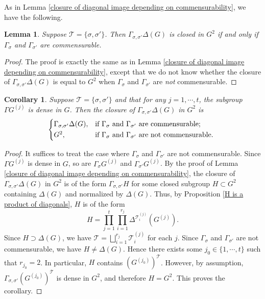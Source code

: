 \documentclass[11pt,oneside,reqno]{amsart}
\newcommand{\Tcal}{\mathcal{T}}
\theoremstyle{plain}
\newtheorem{corollary}[theorem]{Corollary}
\newtheorem{lemma}[theorem]{Lemma}
\begin{document}
	
	
	
	
	
	
	
	
	
	
	As in Lemma \ref{closure of diagonal image depending on commensurability}, we have the following.
	\begin{lemma}
		Suppose $\Tcal=\{\sigma,\sigma'\}$. Then $\Gamma_{\sigma,\sigma'}\Delta(G)$ is closed in $G^2$ if and only if $\Gamma_{\sigma}$ and $\Gamma_{\sigma'}$ are commensurable.
	\end{lemma}
	\begin{proof}
		The proof is exactly the same as in Lemma \ref{closure of diagonal image depending on commensurability}, except that we do not know whether the closure of $\Gamma_{\sigma,\sigma'}\Delta(G)$ is equal to $G^2$ when $\Gamma_{\sigma}$ and $\Gamma_{\sigma'}$ are \emph{not} commensurable.
	\end{proof}
	
	
	
	
	\begin{corollary}\label{Gamma_sigma and Gamma_sigma' comm or not, not simple}
		Suppose $\Tcal=\{\sigma,\sigma'\}$ and that for any $j=1,\cdots,t$, the subgroup $\Gamma G^{(j)}$ is dense in $G$. Then the closure of $\Gamma_{\sigma,\sigma'}\Delta(G)$ in $G^2$ is
		\[
		\begin{cases*}
			\Gamma_{\sigma,\sigma'}\Delta(G),
			&
			if $\Gamma_{\sigma}$ and $\Gamma_{\sigma'}$ are commensurable;
			\\
			G^2,
			&
			if $\Gamma_{\sigma}$ and $\Gamma_{\sigma'}$ are not commensurable.
		\end{cases*}
		\]
	\end{corollary}
	\begin{proof}
		It suffices to treat the case where $\Gamma_{\sigma}$ and $\Gamma_{\sigma'}$ are not commensurable.
		Since $\Gamma G^{(j)}$ is dense in $G$, so are $\Gamma_{\sigma}G^{(j)}$ and $\Gamma_{\sigma'}G^{(j)}$.
		By the proof of Lemma \ref{closure of diagonal image depending on commensurability}, the closure of $\Gamma_{\sigma,\sigma'}\Delta(G)$ in $G^2$ is of the form $\Gamma_{\sigma,\sigma'}H$ for some closed subgroup $H\subset G^2$ containing $\Delta(G)$ and normalized by $\Delta(G)$.
		Thus, by Proposition \ref{H is a product of diagonals}, $H$ is of the form
		\[
		H=\prod_{j=1}^t\prod_{i=1}^{r_j}\Delta^{\Tcal_i^{(j)}}(G^{(j)}).
		\]
		Since $H\supset\Delta(G)$, we have $\Tcal=\bigsqcup_{i=1}^{r_j}\Tcal_i^{(j)}$ for each $j$.
		Since $\Gamma_{\sigma}$ and $\Gamma_{\sigma'}$ are not commensurable, we have $H\neq\Delta(G)$. Hence there exists some $j_0\in\{1,\cdots,t\}$ such that $r_{j_0}=2$. In particular, $H$ contains $(G^{(j_0)})^{\Tcal}$.
		However, by assumption, $\Gamma_{\sigma,\sigma'}(G^{(j_0)})^{\Tcal}$ is dense in $G^2$, and therefore $H=G^2$. This proves the corollary.
	\end{proof}
	
\end{document}
